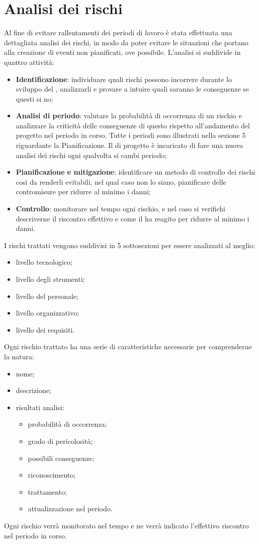\documentclass[PianoDiProgetto.tex]{subfiles}
\begin{document}
\section{Analisi dei rischi}
Al fine di evitare rallentamenti dei periodi di lavoro è stata effettuata una dettagliata analisi dei rischi, in modo da poter evitare le situazioni che portano alla creazione di eventi non pianificati, ove possibile. L'analisi si suddivide in quattro attività:
	\begin{itemize}
		\item \textbf{Identificazione}: individuare quali rischi possono incorrere durante lo sviluppo del , analizzarli e provare a intuire quali saranno le conseguenze se questi si no;
		\item \textbf{Analisi di periodo}: valutare la probabilità di occorrenza di un rischio e analizzare la criticità delle conseguenze di questo rispetto all'andamento del progetto nel periodo in corso. Tutte i periodi sono illustrati nella sezione 5 riguardante la Pianificazione. Il \RESP{} di progetto è incaricato  di fare una nuova analisi dei rischi ogni qualvolta si cambi periodo;
		\item \textbf{Pianificazione e mitigazione}: identificare un metodo di controllo dei rischi così da renderli evitabili, nel qual caso non lo siano, pianificare delle contromisure per ridurre al minimo i danni;
		\item \textbf{Controllo}: monitorare nel tempo ogni rischio, e nel caso si verifichi descriverne il riscontro effettivo e come il  ha reagito per ridurre al minimo i danni.
	\end{itemize}
I rischi trattati vengono suddivisi in 5 sottosezioni per essere analizzati al meglio:
	\begin{itemize}
		\item livello tecnologico;
		\item livello degli strumenti;
		\item livello del personale;
		\item livello organizzativo;
		\item livello dei requisiti.
	\end{itemize}
Ogni rischio trattato ha una serie di caratteristiche necessarie per comprenderne la natura:
	\begin{itemize}
		\item nome;
		\item descrizione;
		\item risultati analisi:
			\begin{itemize}
				\item probabilità di occorrenza;
				\item grado di pericolosità;
				\item possibili conseguenze;
				\item riconoscimento;
				\item trattamento;
				\item attualizzazione nel periodo.
			\end{itemize}
	\end{itemize}
Ogni rischio verrà monitorato nel tempo e ne verrà indicato l'effettivo riscontro nel periodo in corso.
\end{document}
